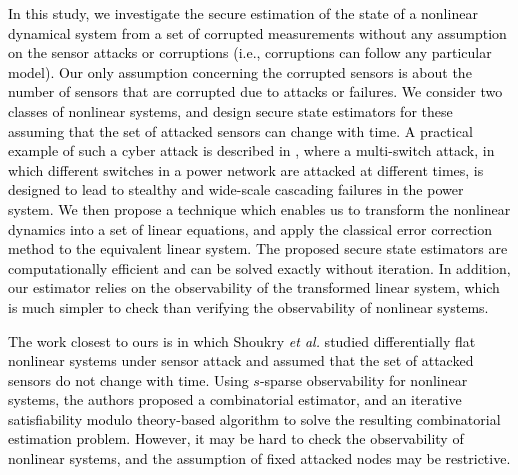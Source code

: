 \textcolor{black}{In this study, we investigate the secure estimation of the state of a nonlinear dynamical system from a set of corrupted measurements without any assumption on the sensor attacks or corruptions (i.e., corruptions can follow any particular model). Our only assumption concerning the corrupted sensors is about the number of sensors that are corrupted due to attacks or failures. We consider two classes of nonlinear systems, and design secure state estimators for \textcolor{black}{these} assuming that the set of attacked sensors can change with time. \textcolor{black}{A practical example of such a cyber attack is described in \cite{kundur_time}, where a multi-switch attack, in which different switches in a power network are attacked at different times, is designed to lead to stealthy and wide-scale cascading failures in the power system.}
We then propose a technique which enables us to transform the nonlinear dynamics into a set of linear equations, and apply the classical error correction method to the equivalent linear system. The proposed secure state estimators are computationally efficient and can be solved exactly without iteration. \textcolor{black}{In addition, our estimator relies on the observability of the transformed linear system, which is much simpler to check than verifying the observability of nonlinear systems.}} %






\textcolor{black}{The work closest to ours is \cite{shoukry} in which Shoukry \textit{et al.} studied differentially flat nonlinear systems under sensor attack and assumed that the set of attacked sensors do not change with time. Using $s$-sparse observability for nonlinear systems, the authors proposed a combinatorial estimator, and an iterative satisfiability modulo theory-based algorithm to solve the resulting combinatorial estimation problem. However, it may be hard to check the observability of nonlinear systems, and the assumption of fixed attacked nodes may be restrictive.}





